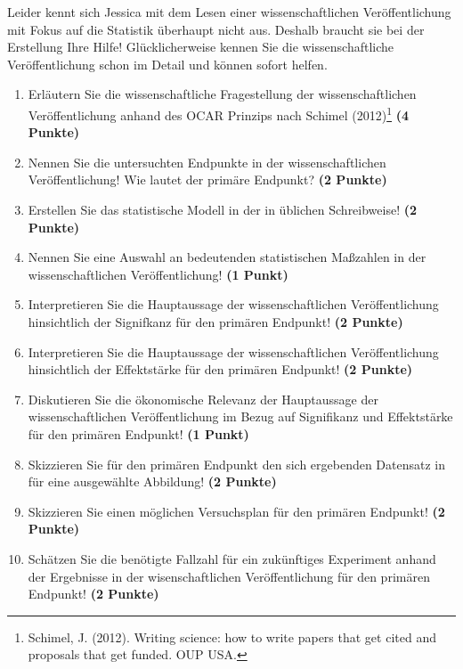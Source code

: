 \documentclass[a4paper, 9pt]{scrartcl}\usepackage[]{graphicx}\usepackage[]{xcolor}
\begin{document}
Leider kennt sich Jessica mit dem Lesen einer wissenschaftlichen Veröffentlichung mit Fokus auf die Statistik überhaupt nicht aus. Deshalb braucht sie bei der Erstellung Ihre Hilfe! Glücklicherweise kennen Sie die wissenschaftliche Veröffentlichung schon im Detail und können sofort helfen.

\begin{enumerate}
  \setcounter{enumi}{0}
  \item Erläutern Sie die wissenschaftliche Fragestellung der wissenschaftlichen Veröffentlichung anhand des OCAR Prinzips nach Schimel (2012)\footnote{Schimel, J. (2012). Writing science: how to write papers that get cited and proposals that get funded. OUP USA.} \textbf{(4 Punkte)}
  \item Nennen Sie die untersuchten Endpunkte in der wissenschaftlichen Veröffentlichung! Wie lautet der primäre Endpunkt? \textbf{(2 Punkte)} 
\item Erstellen Sie das statistische Modell in der in \Rlogo üblichen Schreibweise! \textbf{(2 Punkte)}
  \item Nennen Sie eine Auswahl an bedeutenden statistischen Maßzahlen in der wissenschaftlichen Veröffentlichung! \textbf{(1 Punkt)}
  \item Interpretieren Sie die Hauptaussage der wissenschaftlichen Veröffentlichung hinsichtlich der Signifkanz für den primären Endpunkt! \textbf{(2 Punkte)}
  \item Interpretieren Sie die Hauptaussage der wissenschaftlichen Veröffentlichung hinsichtlich der Effektstärke für den primären Endpunkt! \textbf{(2 Punkte)}
  \item Diskutieren Sie die ökonomische Relevanz der Hauptaussage der wissenschaftlichen Veröffentlichung im Bezug auf Signifikanz und Effektstärke für den primären Endpunkt! \textbf{(1 Punkt)}
  \item Skizzieren Sie für den primären Endpunkt den sich ergebenden Datensatz in \Rlogo für eine ausgewählte Abbildung! \textbf{(2 Punkte)}
\item Skizzieren Sie einen möglichen Versuchsplan für den primären Endpunkt! \textbf{(2 Punkte)}
  \item Schätzen Sie die benötigte Fallzahl für ein zukünftiges Experiment anhand der Ergebnisse in der wisenschaftlichen Veröffentlichung für den primären Endpunkt! \textbf{(2 Punkte)}
\end{enumerate} 
\clearpage
\end{document}
